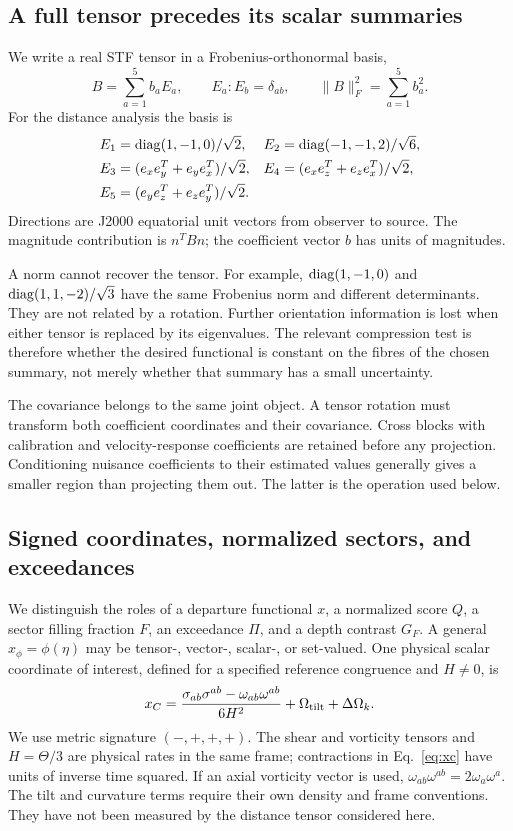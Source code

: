 \subsection{A full tensor precedes its scalar summaries}

We write a real STF tensor in a Frobenius-orthonormal basis,
\begin{equation}
 B=\sum_{a=1}^{5}b_aE_a,\qquad E_a:E_b=\delta_{ab},\qquad
 \|B\|_F^2=\sum_{a=1}^{5}b_a^2.
 \label{eq:tensorbasis}
\end{equation}
For the distance analysis the basis is
\begin{align}
 E_1&=\operatorname{diag}(1,-1,0)/\sqrt2,&
 E_2&=\operatorname{diag}(-1,-1,2)/\sqrt6,\nonumber\\
 E_3&=(e_xe_y^T+e_ye_x^T)/\sqrt2,&
 E_4&=(e_xe_z^T+e_ze_x^T)/\sqrt2,\nonumber\\
 E_5&=(e_ye_z^T+e_ze_y^T)/\sqrt2.
\end{align}
Directions are J2000 equatorial unit vectors from observer to source. The magnitude contribution is $n^TBn$; the coefficient vector $b$ has units of magnitudes.

A norm cannot recover the tensor. For example, $\operatorname{diag}(1,-1,0)$ and $\operatorname{diag}(1,1,-2)/\sqrt3$ have the same Frobenius norm and different determinants. They are not related by a rotation. Further orientation information is lost when either tensor is replaced by its eigenvalues. The relevant compression test is therefore whether the desired functional is constant on the fibres of the chosen summary, not merely whether that summary has a small uncertainty.

The covariance belongs to the same joint object. A tensor rotation must transform both coefficient coordinates and their covariance. Cross blocks with calibration and velocity-response coefficients are retained before any projection. Conditioning nuisance coefficients to their estimated values generally gives a smaller region than projecting them out. The latter is the operation used below.

\subsection{Signed coordinates, normalized sectors, and exceedances}

We distinguish the roles of a departure functional $x$, a normalized score $Q$, a sector filling fraction $F$, an exceedance $\Pi$, and a depth contrast $G_F$. A general $x_\phi=\phi(\eta)$ may be tensor-, vector-, scalar-, or set-valued. One physical scalar coordinate of interest, defined for a specified reference congruence and $H\ne0$, is
\begin{equation}
 x_C=\frac{\sigma_{ab}\sigma^{ab}-\omega_{ab}\omega^{ab}}{6H^2}
       +\Omega_{\rm tilt}+\Delta\Omega_k.
 \label{eq:xc}
\end{equation}
We use metric signature $(-,+,+,+)$. The shear and vorticity tensors and $H=\Theta/3$ are physical rates in the same frame; contractions in Eq.~\eqref{eq:xc} have units of inverse time squared. If an axial vorticity vector is used, $\omega_{ab}\omega^{ab}=2\omega_a\omega^a$. The tilt and curvature terms require their own density and frame conventions. They have not been measured by the distance tensor considered here.

